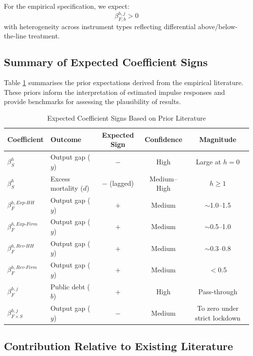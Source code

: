 \documentclass[12pt, a4paper]{article}
\begin{document}
For the empirical specification, we expect:
\begin{equation}
    \beta^{h,j}_{F,b} > 0
\end{equation}
with heterogeneity across instrument types reflecting differential above/below-the-line treatment.

\subsection{Summary of Expected Coefficient Signs}
\label{subsec:summary_priors}

Table \ref{tab:expected_signs} summarises the prior expectations derived from the empirical literature. These priors inform the interpretation of estimated impulse responses and provide benchmarks for assessing the plausibility of results.

\begin{table}[htbp]
\centering
\caption{Expected Coefficient Signs Based on Prior Literature}
\label{tab:expected_signs}
\begin{tabular}{@{}llccc@{}}
\toprule
Coefficient & Outcome & Expected Sign & Confidence & Magnitude \\
\midrule
$\beta^h_S$ & Output gap ($y$) & $-$ & High & Large at $h=0$ \\
$\beta^h_S$ & Excess mortality ($d$) & $-$ (lagged) & Medium--High & $h \geq 1$ \\
$\beta^{h,Exp\text{-}HH}_F$ & Output gap ($y$) & $+$ & Medium & $\sim$1.0--1.5 \\
$\beta^{h,Exp\text{-}Firm}_F$ & Output gap ($y$) & $+$ & Medium & $\sim$0.5--1.0 \\
$\beta^{h,Rev\text{-}HH}_F$ & Output gap ($y$) & $+$ & Medium & $\sim$0.3--0.8 \\
$\beta^{h,Rev\text{-}Firm}_F$ & Output gap ($y$) & $+$ & Medium & $<$0.5 \\
$\beta^{h,j}_F$ & Public debt ($b$) & $+$ & High & Pass-through \\
$\beta^{h,j}_{F \times S}$ & Output gap ($y$) & $-$ & Medium & To zero under strict lockdown \\
\bottomrule
\end{tabular}
\end{table}

\subsection{Contribution Relative to Existing Literature}
\label{subsec:contribution}
\end{document}
